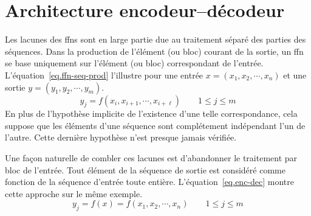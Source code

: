\section{Architecture encodeur--décodeur}

Les lacunes des \glspl{ffn} sont en large partie due au traitement séparé des parties des séquences.
Dans la production de l'élément (ou bloc) courant de la sortie,
un \gls{ffn} se base uniquement sur l'élément (ou bloc) correspondant de l'entrée.
L'équation~\ref{eq.ffn-seq-prod} l'illustre pour une entrée \(x = (x_1, x_2, \cdots, x_n)\)
et une sortie \(y = (y_1, y_2, \cdots, y_m)\).
\begin{equation}
    \label{eq.ffn-seq-prod}
    y_j = f(x_i, x_{i+1}, \cdots, x_{i+\ell}) \qquad 1 \le j \le m
\end{equation}
En plus de l'hypothèse implicite de l'existence d'une telle correspondance,
cela suppose que les éléments d'une séquence sont complétement indépendant l'un de l'autre.
Cette dernière hypothèse n'est presque jamais vérifiée. 

Une façon naturelle de combler ces lacunes est d'abandonner le traitement par bloc de l'entrée.
Tout élément de la séquence de sortie est considéré comme fonction de la séquence d'entrée toute entière.
L'équation~\ref{eq.enc-dec} montre cette approche sur le même exemple.
\begin{equation}
    \label{eq.enc-dec}
    y_j = f(x) = f(x_1, x_2, \cdots, x_n) \qquad 1 \le j \le m
\end{equation}

